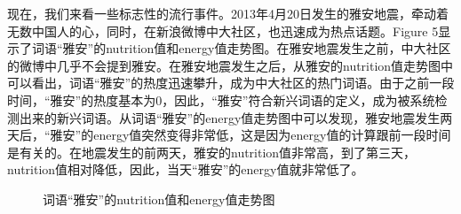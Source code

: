 \documentclass[a4paper]{article}
\begin{document}
\indent 现在，我们来看一些标志性的流行事件。2013年4月20日发生的雅安地震，牵动着无数中国人的心，同时，在新浪微博中大社区，也迅速成为热点话题。Figure 5显示了词语“雅安”的nutrition值和energy值走势图。在雅安地震发生之前，中大社区的微博中几乎不会提到雅安。在雅安地震发生之后，从雅安的nutrition值走势图中可以看出，词语“雅安”的热度迅速攀升，成为中大社区的热门词语。由于之前一段时间，“雅安”的热度基本为0，因此，“雅安”符合新兴词语的定义，成为被系统检测出来的新兴词语。从词语“雅安”的energy值走势图中可以发现，雅安地震发生两天后，“雅安”的energy值突然变得非常低，这是因为energy值的计算跟前一段时间是有关的。在地震发生的前两天，雅安的nutrition值非常高，到了第三天，nutrition值相对降低，因此，当天“雅安”的energy值就非常低了。
\begin{figure}[H]
\centering
{}
\caption{词语“雅安”的nutrition值和energy值走势图}
\label{fig:5}
\end{figure}
\end{document}
